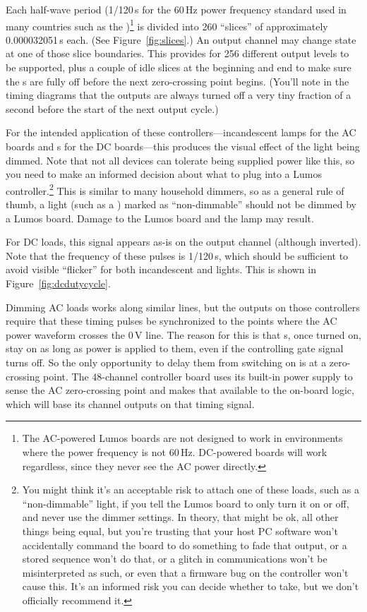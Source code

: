 \documentclass[letterpaper,twoside,onecolumn,openright,final]{memoir}
\begin{document}
Each half-wave period (1/120\,s for the 60\,Hz power frequency standard
used in many countries such as the )\footnote{The AC-powered Lumos boards 
are not designed to work in environments where the power frequency is not 60\,Hz.  DC-powered
boards will work regardless, since they never see the AC power directly.} is divided
into 260 ``slices'' of approximately 0.000032051\,s each.  (See Figure~\ref{fig:slices}.)
An output channel may change
state at one of those slice boundaries.  This provides for 256 different output levels 
to be supported, plus a couple of idle slices at the beginning and end to make 
sure the s are fully off before the next zero-crossing point begins.
(You'll note in the timing diagrams that the outputs are always turned off a very tiny fraction
of a second before the start of the next output cycle.)



For the intended application of these controllers---incandescent lamps for the AC
boards and s for the DC boards---this produces the visual effect of the light
being dimmed.  Note that not all devices can tolerate being supplied power like this,
so you need to make an informed decision about what to plug into a Lumos 
controller.\footnote{You might think it's an acceptable risk to attach one of these loads, such as a
``non-dimmable''  light, if you tell the Lumos board to only turn it on
or off, and never use the dimmer settings.  In theory, that might be ok, all other things
being equal, but you're trusting that your host PC software won't accidentally command
the board to do something to fade that output, or a stored sequence won't do that,
or a glitch in communications won't be misinterpreted as such, or even that a firmware
bug on the controller won't cause this. It's an informed risk you can decide whether to take, but
we don't officially recommend it.} This is similar to many household dimmers, so as a general
rule of thumb, a light (such as a ) marked as ``non-dimmable'' should not
be dimmed by a Lumos board.  Damage to the Lumos board and the lamp may result.

For DC loads, this  signal appears as-is on the output channel (although
inverted).  Note that the frequency of these pulses is 1/120\,s, which should be
sufficient to avoid visible ``flicker'' for both incandescent and  lights.
This is shown in Figure~\ref{fig:dcdutycycle}.


Dimming AC loads works along similar lines, but the  outputs on those
controllers require that these timing pulses be synchronized to the points where the AC
power waveform crosses the 0\,V line.  The reason for this is that s, once
turned on, stay on as long as power is applied to them, even if the controlling gate signal
turns off.  So the only opportunity to delay them from switching on is at a zero-crossing
point.  The 48-channel controller board uses its built-in power supply to sense the
AC zero-crossing point and makes that available to the on-board logic, which will base its channel outputs
on that timing signal.
\end{document}
